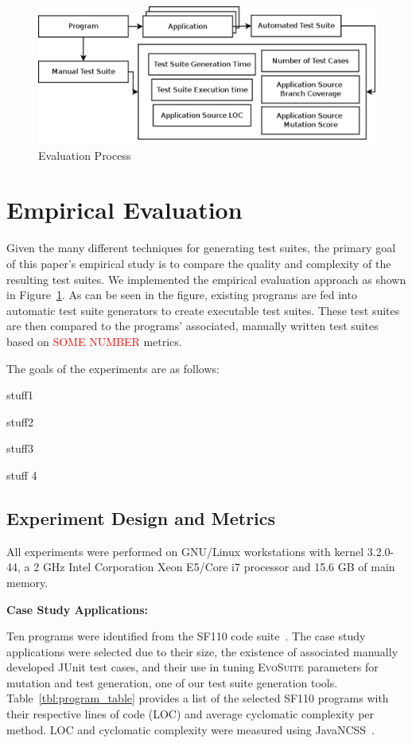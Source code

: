 
\begin{figure}[!t]
\centering
\captionsetup{justification=centering}
  \includegraphics[width=\linewidth]{proccess_diagram.pdf}
    \caption{Evaluation Process}
  \label{fig:process_diagram}
\end{figure}

\section{Empirical Evaluation}
\label{sec:evaluation}
Given the many different techniques for generating test suites, the primary goal of this paper's empirical study is to compare the quality and complexity of the resulting test suites.  We implemented the empirical evaluation approach as shown in Figure~\ref{fig:process_diagram}.  As can be seen in the figure, existing programs are fed into automatic test suite generators to create executable test suites.  These test suites are then compared to the programs' associated, manually written test suites based on \textcolor{red}{SOME NUMBER} metrics.   

The goals of the experiments are as follows:
\squishlist
\item stuff1
\item stuff2
\item stuff3
\item stuff 4
\squishend

\subsection{Experiment Design and Metrics}
All experiments were performed on GNU/Linux workstations with kernel 3.2.0-44, a 2 GHz Intel Corporation Xeon E5/Core i7 processor and  15.6 GB of main memory. 

\noindent \textbf{Case Study Applications:}  

Ten programs were identified from the SF110 code suite~\cite{fraser:2012}.  The case study applications were selected due to their size, the existence of associated manually developed JUnit test cases, and their use in tuning \textsc{EvoSuite} parameters for mutation and test generation, one of our test suite generation tools.  Table~\ref{tbl:program_table} provides a list of the selected SF110 programs with their respective lines of code (LOC) and average cyclomatic complexity per method.  LOC and cyclomatic complexity were measured using JavaNCSS~\cite{leejavancss}.  

